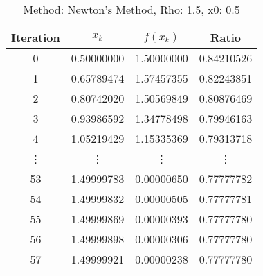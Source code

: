 \begin{table}
\centering
\caption{Method: Newton's Method, Rho: 1.5, x0: 0.5}
\label{tab:table_Newton's_Method_1_5_0_5}
\begin{tabular}{c c c c}
\toprule
Iteration &      $x_k$ &   $f(x_k)$ &      Ratio \\
\midrule
        0 & 0.50000000 & 1.50000000 & 0.84210526 \\
        1 & 0.65789474 & 1.57457355 & 0.82243851 \\
        2 & 0.80742020 & 1.50569849 & 0.80876469 \\
        3 & 0.93986592 & 1.34778498 & 0.79946163 \\
        4 & 1.05219429 & 1.15335369 & 0.79313718 \\
   \vdots &     \vdots &     \vdots &     \vdots \\
       53 & 1.49999783 & 0.00000650 & 0.77777782 \\
       54 & 1.49999832 & 0.00000505 & 0.77777781 \\
       55 & 1.49999869 & 0.00000393 & 0.77777780 \\
       56 & 1.49999898 & 0.00000306 & 0.77777780 \\
       57 & 1.49999921 & 0.00000238 & 0.77777780 \\
\bottomrule
\end{tabular}
\end{table}
